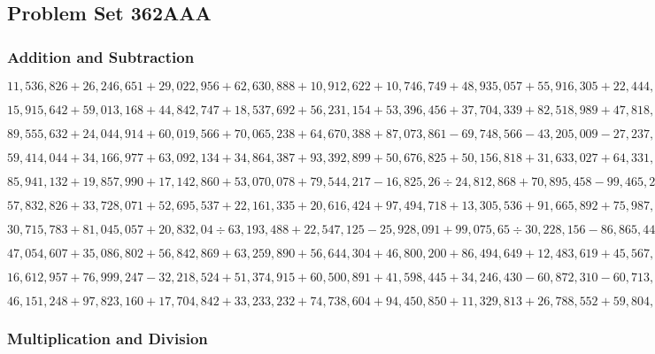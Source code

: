 \hypertarget{problem-set-362aaa}{%
\subsection{Problem Set 362AAA}\label{problem-set-362aaa}}

\hypertarget{addition-and-subtraction}{%
\subsubsection{Addition and
Subtraction}\label{addition-and-subtraction}}

\(11,536,826+26,246,651+29,022,956+62,630,888+10,912,622+10,746,749+48,935,057+55,916,305+22,444,247+39,535,888\)

\(15,915,642+59,013,168+44,842,747+18,537,692+56,231,154+53,396,456+37,704,339+82,518,989+47,818,070+97,034,904\)

\(89,555,632+24,044,914+60,019,566+70,065,238+64,670,388+87,073,861-69,748,566-43,205,009-27,237,780-95,522,428\)

\(59,414,044+34,166,977+63,092,134+34,864,387+93,392,899+50,676,825+50,156,818+31,633,027+64,331,714+35,158,074\)

\(85,941,132+19,857,990+17,142,860+53,070,078+79,544,217-16,825,26÷24,812,868+70,895,458-99,465,247-87,411,429\)

\(57,832,826+33,728,071+52,695,537+22,161,335+20,616,424+97,494,718+13,305,536+91,665,892+75,987,977+29,657,498\)

\(30,715,783+81,045,057+20,832,04÷63,193,488+22,547,125-25,928,091+99,075,65÷30,228,156-86,865,447+92,632,002\)

\(47,054,607+35,086,802+56,842,869+63,259,890+56,644,304+46,800,200+86,494,649+12,483,619+45,567,035+35,893,707\)

\(16,612,957+76,999,247-32,218,524+51,374,915+60,500,891+41,598,445+34,246,430-60,872,310-60,713,970-82,896,075\)

\(46,151,248+97,823,160+17,704,842+33,233,232+74,738,604+94,450,850+11,329,813+26,788,552+59,804,158+98,230,689\)

\hypertarget{multiplication-and-division}{%
\subsubsection{Multiplication and
Division}\label{multiplication-and-division}}

